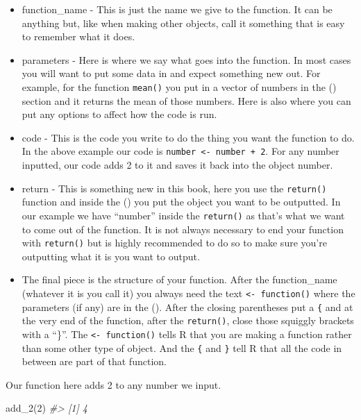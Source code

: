\documentclass[
]{krantz}
\makeatletter
\newenvironment{Shaded}{\begin{snugshade}}{\end{snugshade}}
\newcommand{\CommentTok}[1]{\textcolor[rgb]{0.37,0.37,0.37}{\textit{#1}}}
\newcommand{\DecValTok}[1]{\textcolor[rgb]{0.06,0.06,0.06}{#1}}
\newcommand{\FunctionTok}[1]{\textcolor[rgb]{0,0,0}{#1}}
\newcommand{\NormalTok}[1]{#1}
\providecommand{\tightlist}{%
  \setlength{\itemsep}{0pt}\setlength{\parskip}{0pt}}
\newenvironment{kframe}{%
\medskip{}
\setlength{\fboxsep}{.8em}
 \def\at@end@of@kframe{}%
 \ifinner\ifhmode%
  \def\at@end@of@kframe{\end{minipage}}%
  \begin{minipage}{\columnwidth}%
 \fi\fi%
 \def\FrameCommand##1{\hskip\@totalleftmargin \hskip-\fboxsep
 \colorbox{shadecolor}{##1}\hskip-\fboxsep
     \hskip-\linewidth \hskip-\@totalleftmargin \hskip\columnwidth}%
 \MakeFramed {\advance\hsize-\width
   \@totalleftmargin\z@ \linewidth\hsize
   \@setminipage}}%
 {\par\unskip\endMakeFramed%
 \at@end@of@kframe}
\renewenvironment{Shaded}{\begin{kframe}}{\end{kframe}}
\makeatother
\begin{document}
\begin{itemize}
\tightlist
\item
  function\_name - This is just the name we give to the function. It can be anything but, like when making other objects, call it something that is easy to remember what it does.
\item
  parameters - Here is where we say what goes into the function. In most cases you will want to put some data in and expect something new out. For example, for the function \texttt{mean()} you put in a vector of numbers in the () section and it returns the mean of those numbers. Here is also where you can put any options to affect how the code is run.
\item
  code - This is the code you write to do the thing you want the function to do. In the above example our code is \texttt{number\ \textless{}-\ number\ +\ 2}. For any number inputted, our code adds 2 to it and saves it back into the object number.
\item
  return - This is something new in this book, here you use the \texttt{return()} function and inside the () you put the object you want to be outputted. In our example we have ``number'' inside the \texttt{return()} as that's what we want to come out of the function. It is not always necessary to end your function with \texttt{return()} but is highly recommended to do so to make sure you're outputting what it is you want to output.
\item
  The final piece is the structure of your function. After the function\_name (whatever it is you call it) you always need the text \texttt{\textless{}-\ function()} where the parameters (if any) are in the (). After the closing parentheses put a \texttt{\{} and at the very end of the function, after the \texttt{return()}, close those squiggly brackets with a ``\}''. The \texttt{\textless{}-\ function()} tells R that you are making a function rather than some other type of object. And the \texttt{\{} and \texttt{\}} tell R that all the code in between are part of that function.
\end{itemize}

Our function here adds 2 to any number we input.

\begin{Shaded}
\begin{Highlighting}[]
\FunctionTok{add\_2}\NormalTok{(}\DecValTok{2}\NormalTok{)}
\CommentTok{\#\textgreater{} [1] 4}
\end{Highlighting}
\end{Shaded}
\end{document}

